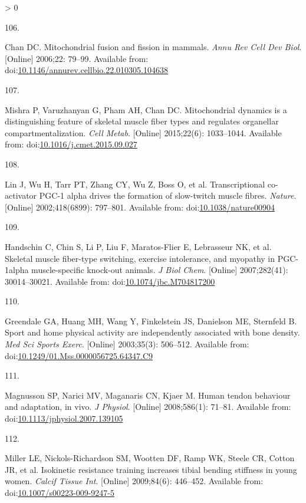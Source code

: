 \documentclass[twoside,10pt]{gihclass} %
\newlength{\cslhangindent}
\newlength{\csllabelwidth}
\newenvironment{CSLReferences}[3] %
 {%
  \setlength{\parindent}{0pt}
  \ifodd #1 \everypar{\setlength{\hangindent}{\cslhangindent}}\ignorespaces\fi
  \ifnum #2 > 0
  \setlength{\parskip}{#2\baselineskip}
  \fi
 }%
 {}
\newcommand{\CSLLeftMargin}[1]{\parbox[t]{\maxof{\widthof{#1}}{\csllabelwidth}}{#1}}
\newcommand{\CSLRightInline}[1]{\parbox[t]{\linewidth}{#1}}
\begin{document}
\begin{CSLReferences}{0}{0}
\leavevmode\hypertarget{ref-RN2817}{}%
\CSLLeftMargin{106. }
\CSLRightInline{Chan DC. Mitochondrial fusion and fission in mammals. \emph{Annu Rev Cell Dev Biol}. {[}Online{]} 2006;22: 79--99. Available from: doi:\href{https://doi.org/10.1146/annurev.cellbio.22.010305.104638}{10.1146/annurev.cellbio.22.010305.104638}}

\leavevmode\hypertarget{ref-RN2816}{}%
\CSLLeftMargin{107. }
\CSLRightInline{Mishra P, Varuzhanyan G, Pham AH, Chan DC. Mitochondrial dynamics is a distinguishing feature of skeletal muscle fiber types and regulates organellar compartmentalization. \emph{Cell Metab}. {[}Online{]} 2015;22(6): 1033--1044. Available from: doi:\href{https://doi.org/10.1016/j.cmet.2015.09.027}{10.1016/j.cmet.2015.09.027}}

\leavevmode\hypertarget{ref-RN2818}{}%
\CSLLeftMargin{108. }
\CSLRightInline{Lin J, Wu H, Tarr PT, Zhang CY, Wu Z, Boss O, et al. Transcriptional co-activator PGC-1 alpha drives the formation of slow-twitch muscle fibres. \emph{Nature}. {[}Online{]} 2002;418(6899): 797--801. Available from: doi:\href{https://doi.org/10.1038/nature00904}{10.1038/nature00904}}

\leavevmode\hypertarget{ref-RN2819}{}%
\CSLLeftMargin{109. }
\CSLRightInline{Handschin C, Chin S, Li P, Liu F, Maratos-Flier E, Lebrasseur NK, et al. Skeletal muscle fiber-type switching, exercise intolerance, and myopathy in PGC-1alpha muscle-specific knock-out animals. \emph{J Biol Chem}. {[}Online{]} 2007;282(41): 30014--30021. Available from: doi:\href{https://doi.org/10.1074/jbc.M704817200}{10.1074/jbc.M704817200}}

\leavevmode\hypertarget{ref-RN2775}{}%
\CSLLeftMargin{110. }
\CSLRightInline{Greendale GA, Huang MH, Wang Y, Finkelstein JS, Danielson ME, Sternfeld B. Sport and home physical activity are independently associated with bone density. \emph{Med Sci Sports Exerc}. {[}Online{]} 2003;35(3): 506--512. Available from: doi:\href{https://doi.org/10.1249/01.Mss.0000056725.64347.C9}{10.1249/01.Mss.0000056725.64347.C9}}

\leavevmode\hypertarget{ref-RN2771}{}%
\CSLLeftMargin{111. }
\CSLRightInline{Magnusson SP, Narici MV, Maganaris CN, Kjaer M. Human tendon behaviour and adaptation, in vivo. \emph{J Physiol}. {[}Online{]} 2008;586(1): 71--81. Available from: doi:\href{https://doi.org/10.1113/jphysiol.2007.139105}{10.1113/jphysiol.2007.139105}}

\leavevmode\hypertarget{ref-RN2774}{}%
\CSLLeftMargin{112. }
\CSLRightInline{Miller LE, Nickols-Richardson SM, Wootten DF, Ramp WK, Steele CR, Cotton JR, et al. Isokinetic resistance training increases tibial bending stiffness in young women. \emph{Calcif Tissue Int}. {[}Online{]} 2009;84(6): 446--452. Available from: doi:\href{https://doi.org/10.1007/s00223-009-9247-5}{10.1007/s00223-009-9247-5}}


\end{CSLReferences}
\end{document}
